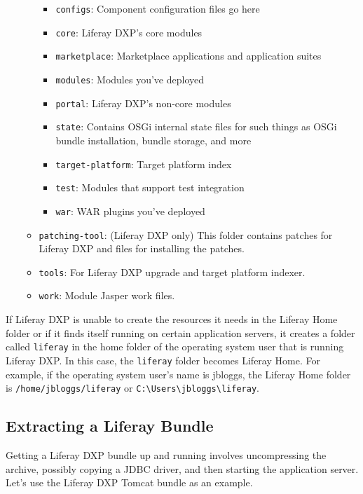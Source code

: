 \begin{itemize}
\begin{itemize}
    \begin{itemize}
    \tightlist
    \item
      \texttt{configs}: Component configuration files go here
    \item
      \texttt{core}: Liferay DXP's core modules
    \item
      \texttt{marketplace}: Marketplace applications and application
      suites
    \item
      \texttt{modules}: Modules you've deployed
    \item
      \texttt{portal}: Liferay DXP's non-core modules
    \item
      \texttt{state}: Contains OSGi internal state files for such things
      as OSGi bundle installation, bundle storage, and more
    \item
      \texttt{target-platform}: Target platform index
    \item
      \texttt{test}: Modules that support test integration
    \item
      \texttt{war}: WAR plugins you've deployed
    \end{itemize}
  \item
    \texttt{patching-tool}: (Liferay DXP only) This folder contains
    patches for Liferay DXP and files for installing the patches.
  \item
    \texttt{tools}: For Liferay DXP upgrade and target platform indexer.
  \item
    \texttt{work}: Module Jasper work files.
  \end{itemize}
\end{itemize}

If Liferay DXP is unable to create the resources it needs in the Liferay
Home folder or if it finds itself running on certain application
servers, it creates a folder called \texttt{liferay} in the home folder
of the operating system user that is running Liferay DXP. In this case,
the \texttt{liferay} folder becomes Liferay Home. For example, if the
operating system user's name is jbloggs, the Liferay Home folder is
\texttt{/home/jbloggs/liferay} or
\texttt{C:\textbackslash{}Users\textbackslash{}jbloggs\textbackslash{}liferay}.

\subsection{Extracting a Liferay
Bundle}\label{extracting-a-liferay-bundle}

Getting a Liferay DXP bundle up and running involves uncompressing the
archive, possibly copying a JDBC driver, and then starting the
application server. Let's use the Liferay DXP Tomcat bundle as an
example.

